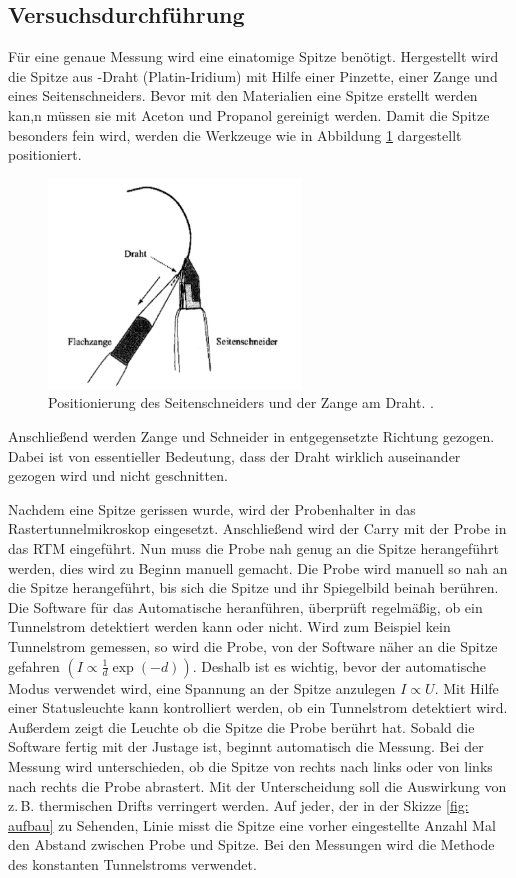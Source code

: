 \subsection{Versuchsdurchführung}

Für eine genaue Messung wird eine einatomige Spitze benötigt.
Hergestellt wird die Spitze aus -Draht (Platin-Iridium)
mit Hilfe einer Pinzette, einer Zange und eines Seitenschneiders.
Bevor mit den Materialien eine Spitze erstellt werden kan,n müssen sie mit Aceton und Propanol gereinigt werden.
Damit die Spitze besonders fein wird, werden die Werkzeuge wie in Abbildung \ref{fig: zange_schneider}
dargestellt positioniert.
\begin{figure}[!h]
  \centering
  \includegraphics[width=0.6\textwidth]{./pics/herstellung_spitze.png}
  \caption{Positionierung des Seitenschneiders und der Zange am Draht. \cite{anleitung_frankfurt}.}
  \label{fig: zange_schneider}
\end{figure}
Anschließend werden Zange und Schneider in entgegensetzte Richtung gezogen.
Dabei ist von essentieller Bedeutung, dass der Draht wirklich auseinander gezogen wird und
nicht geschnitten.

Nachdem eine Spitze gerissen wurde, wird der Probenhalter in das Rastertunnelmikroskop eingesetzt.
Anschließend wird der Carry mit der Probe in das RTM eingeführt.
Nun muss die Probe nah genug an die Spitze herangeführt werden, dies wird zu Beginn
manuell gemacht. Die Probe wird manuell so nah an die Spitze herangeführt, bis sich
die Spitze und ihr Spiegelbild beinah berühren. Die Software für das Automatische
heranführen, überprüft regelmäßig, ob ein Tunnelstrom detektiert werden kann oder nicht.
Wird zum Beispiel kein Tunnelstrom gemessen, so wird die Probe, von der Software
näher an die Spitze gefahren $\left(I\propto \frac{1}{d}\exp{(-d)}\right)$.
Deshalb ist es wichtig, bevor der automatische
Modus verwendet wird, eine Spannung an der Spitze anzulegen $I\propto U$. Mit Hilfe einer
Statusleuchte kann kontrolliert werden, ob ein Tunnelstrom detektiert wird. Außerdem zeigt die Leuchte
ob die Spitze die Probe berührt hat.
Sobald die Software fertig mit der Justage ist, beginnt automatisch die Messung.
Bei der Messung wird unterschieden, ob die Spitze von rechts nach links oder von links nach rechts
die Probe abrastert. Mit der Unterscheidung soll die Auswirkung von z.\,B. thermischen Drifts verringert werden.
 Auf jeder, der in der Skizze \ref{fig: aufbau} zu Sehenden, Linie misst die Spitze eine
vorher eingestellte Anzahl Mal den Abstand zwischen Probe und Spitze.
Bei den Messungen wird die Methode des konstanten Tunnelstroms verwendet.

